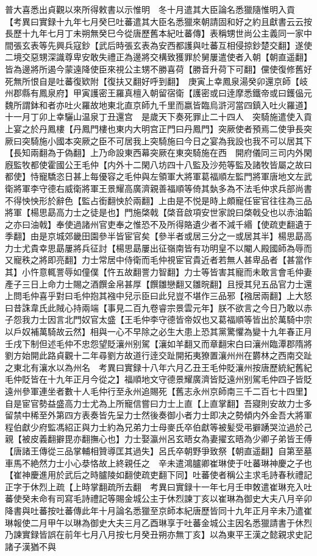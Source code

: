 普大喜悉出貞觀以來所得敕書以示惟明　冬十月遣其大臣論名悉獵隨惟明入貢　【考異曰實録十九年七月癸巳吐蕃遣其大臣名悉獵來朝請固和好之約且獻書云云按長歷十九年七月丁未朔無癸巳今從唐歷舊本紀吐蕃傳】表稱甥世尚公主義同一家中間張玄表等先興兵寇鈔【武后時張玄表為安西都護與吐蕃互相侵掠鈔楚交翻】遂使二境交惡甥深識尊卑安敢失禮正為邊將交構致獲罪於舅屢遣使者入朝【朝直遥翻】皆為邊將所遏今蒙遠降使臣來視公主甥不勝喜荷【勝音升荷下可翻】儻使復修舊好死無所恨自是吐蕃復欵附【復扶又翻好呼到翻】　庚寅上幸鳳泉湯癸卯還京師【岐州郡縣有鳳泉府】甲寅護密王羅真檀入朝留宿衛【護密或曰逹摩悉鐵帝或曰鑊偘元魏所謂鉢和者亦吐火羅故地東北直京師九千里而嬴皆臨烏滸河當四鎮入吐火羅道】十一月丁卯上幸驪山温泉丁丑還宫　是歲天下奏死罪止二十四人　突騎施遣使入貢上宴之於丹鳳樓【丹鳳門樓也東内大明宫正門曰丹鳳門】突厥使者預焉二使爭長突厥曰突騎施小國本突厥之臣不可居我上突騎施曰今日之宴為我設也我不可以居其下【長知兩翻為于偽翻】上乃命設東西幕突厥在東突騎施在西　開府儀同三司内外閑廐監牧都使霍國公王毛仲【内外十二閑八坊四十八監及沙苑等監及諸牧皆屬之故曰都使】恃寵驕恣日甚上每優容之毛仲與左領軍大將軍葛福順左監門將軍唐地文左武衛將軍李守德右威衛將軍王景耀高廣濟親善福順等倚其埶多為不法毛仲求兵部尚書不得怏怏形於辭色【監占銜翻怏於兩翻】上由是不悦是時上頗寵任宦官往往為三品將軍【楊思勗高力士之徒是也】門施棨戟【棨音啟項安世家說曰棨戟殳也以赤油韜之亦曰油戟】奉使過諸州官吏奉之惟恐不及所得賂遺少者不減千緡【使疏吏翻遺于季翻】由是京城郊畿田園參半皆宦官矣【參半者或居三分之一或居其半】楊思勗高力士尤貴幸思勗屢將兵征討【楊思勗屢出征嶺南皆有功明皇不以閹人殿國師為辱而又寵秩之將即亮翻】力士常居中侍衛而毛仲視宦官貴近者若無人甚卑品者【甚當作其】小忤意輒詈辱如僮僕【忤五故翻詈力智翻】力士等皆害其寵而未敢言會毛仲妻產子三日上命力士賜之酒饌金帛甚厚【饌雛戀翻又雛晥翻】且授其兒五品官力士還上問毛仲喜乎對曰毛仲抱其襁中兒示臣曰此兒豈不堪作三品邪【襁居兩翻】上大怒曰昔誅韋氏此賊心持兩端【事見二百九卷睿宗景雲元年】朕不欲言之今日乃敢以赤子怨我力士因言北門奴官太盛【王毛仲李守德皆帝奴也又葛福順等皆出於萬騎中宗以戶奴補萬騎故云然】相與一心不早除之必生大患上恐其黨驚懼為變十九年春正月壬戌下制但述毛仲不忠怨望貶瀼州别駕【瀼如羊翻又而章翻宋白曰瀼州臨潭郡隋將劉方始開此路貞觀十二年尋劉方故道行逹交趾開拓夷獠置瀼州州在欝林之西南交趾之東北有瀼水以為州名　考異曰實録十八年六月乙丑王毛仲貶瀼州按唐歷統紀舊紀毛仲貶皆在十九年正月今從之】福順地文守德景耀廣濟皆貶遠州别駕毛仲四子皆貶遠州參軍連坐者數十人毛仲行至永州追賜死【舊志永州京師南三千二百七十四里】自是宦官勢益盛高力士尤為上所寵信嘗曰力士上直【上直掌翻】吾寢則安故力士多留禁中稀至外第四方表奏皆先呈力士然後奏御小者力士即决之勢傾内外金吾大將軍程伯獻少府監馮紹正與力士約為兄弟力士母麥氏卒伯獻等被髪受弔擗踴哭泣過於己親【被皮義翻擗毘亦翻撫心也】力士娶瀛州呂玄晤女為妻擢玄晤為少卿子弟皆王傅【唐諸王傳從三品掌輔相贊導匡其過失】呂氏卒朝野爭致祭【朝直遥翻】自第至墓車馬不絶然力士小心㳟恪故上終親任之　辛未遣鴻臚卿崔琳使于吐蕃琳神慶之子也【崔神慶進用於武后之時臚陵如翻使疏吏翻下同】吐蕃使者稱公主求毛詩春秋禮記正字于休烈上疏【上時掌翻疏所去翻　考異曰實録十一年七月壬申敇遣崔琳充入吐蕃使癸未命有司寫毛詩禮記等賜金城公主于休烈諫丁亥以崔琳為御史大夫八月辛卯降書與吐蕃按吐蕃傳此年十月論名悉獵至京師本紀唐歷皆同十九年正月辛未乃遣崔琳報使二月甲午以琳為御史大夫三月乙酉琳享于吐蕃金城公主因名悉獵請書于休烈乃諫實録皆誤在前年七月八月按七月癸丑朔亦無丁亥】以為東平王漢之懿親求史記諸子漢猶不與